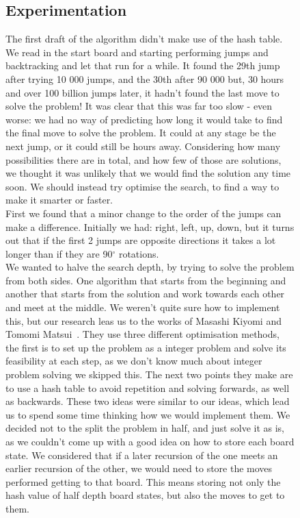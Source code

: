 \documentclass[11pt]{article}
\begin{document}
\begin{figure}
\subsection{Experimentation}
The first draft of the algorithm didn't make use of the hash table. We read in the start board and starting performing jumps and backtracking and let that run for a while.
It found the 29th jump after trying 10 000 jumps, and the 30th after 90 000 but, 30 hours and over 100 billion jumps later, it hadn't found the last move to solve the problem!\newline
It was clear that this was far too slow - even worse: we had no way of predicting how long it would take to find the final move to solve the problem. It could at any stage be the next jump, or it could still be hours away. Considering how many possibilities there are in total, and how few of those are solutions, we thought it was unlikely that we would find the solution any time soon. We should instead try optimise the search, to find a way to make it smarter or faster.\\
First we found that a minor change to the order of the jumps can make a difference. Initially we had: right, left, up, down, but it turns out that if the first 2 jumps are opposite directions it takes a lot longer than if they are 90$^{\circ}$ rotations.\\\newline
We wanted to halve the search depth, by trying to solve the problem from both sides. One algorithm that starts from the beginning and another that starts from the solution and work towards each other and meet at the middle.
We weren't quite sure how to implement this, but our research leas us to the works of Masashi Kiyomi and Tomomi Matsui~\cite{Tomomi}.
They use three different optimisation methods, the first is to set up the problem as a integer problem and solve its feasibility at each step, as we don't know much about integer problem solving we skipped this.\newline
The next two points they make are to use a hash table to avoid repetition and solving forwards, as well as backwards. These two ideas were similar to our ideas, which lead us to spend some time thinking how we would implement them.\newline
We decided not to the split the problem in half, and just solve it as is, as we couldn't come up with a good idea on how to store each board state. We considered that if a later recursion of the one meets an earlier recursion of the other, we would need to store the moves performed getting to that board. This means storing not only the hash value of half depth board states, but also the moves to get to them.\\

\end{figure}
\end{document}
